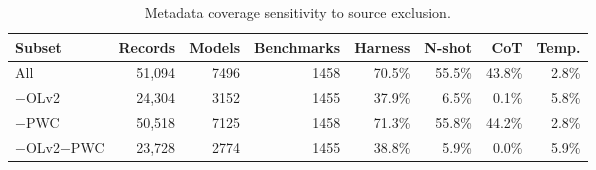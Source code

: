 \begin{table}[t]
\centering
\caption{Metadata coverage sensitivity to source exclusion.}
\label{tab:coverage_sensitivity}
\small
\begin{tabular}{lrrrrrrr}
\toprule
Subset & Records & Models & Benchmarks & Harness & N-shot & CoT & Temp. \\
\midrule
All & 51,094 & 7496 & 1458 & 70.5\% & 55.5\% & 43.8\% & 2.8\% \\
$-$OLv2 & 24,304 & 3152 & 1455 & 37.9\% & 6.5\% & 0.1\% & 5.8\% \\
$-$PWC & 50,518 & 7125 & 1458 & 71.3\% & 55.8\% & 44.2\% & 2.8\% \\
$-$OLv2$-$PWC & 23,728 & 2774 & 1455 & 38.8\% & 5.9\% & 0.0\% & 5.9\% \\
\bottomrule
\end{tabular}
\end{table}